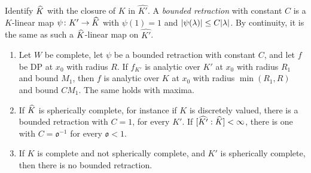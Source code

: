 \begin{proposition}\label{dp:prop:an-descent}
Identify $\widehat K$ with the closure of $K$ in $\widehat{K'}$. A \emph{bounded retraction} with constant $C$ is a $K$-linear map $\psi\colon K'\to\widehat K$ with $\psi(1)=1$ and $\lvert \psi(\lambda)\rvert\le C\lvert \lambda\rvert$. By continuity, it is the same as such a $\widehat K$-linear map on $\widehat{K'}$.
\begin{enumerate}
\item Let $W$ be complete, let $\psi$ be a bounded retraction with constant $C$, and let $f$ be DP at $x_0$ with radius $R$. If $f_{K'}$ is analytic over $K'$ at $x_0$ with radius $R_1$ and bound $M_1$, then $f$ is analytic over $K$ at $x_0$ with radius $\min(R_1,R)$ and bound $CM_1$. The same holds with maxima.
\item If $\widehat K$ is spherically complete, for instance if $K$ is discretely valued, there is a bounded retraction with $C=1$, for every $K'$. If $[\widehat{K'}:\widehat K]<\infty$, there is one with $C=\mathfrak o^{-1}$ for every $\mathfrak o<1$.
\item If $K$ is complete and not spherically complete, and $K'$ is spherically complete, then there is no bounded retraction.
\end{enumerate}
\end{proposition}


